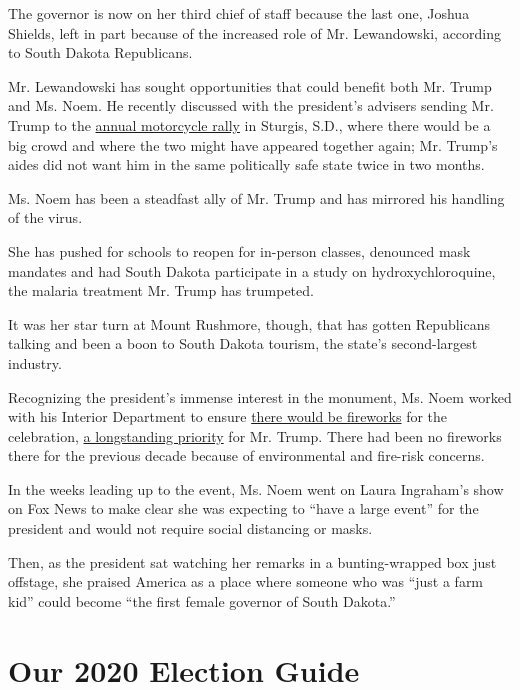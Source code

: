 The governor is now on her third chief of staff because the last one,
Joshua Shields, left in part because of the increased role of Mr.
Lewandowski, according to South Dakota Republicans.

Mr. Lewandowski has sought opportunities that could benefit both Mr.
Trump and Ms. Noem. He recently discussed with the president's advisers
sending Mr. Trump to the
\href{https://www.nytimes.com/2020/08/07/us/sturgis-motorcyle-rally.html}{annual
motorcycle rally} in Sturgis, S.D., where there would be a big crowd and
where the two might have appeared together again; Mr. Trump's aides did
not want him in the same politically safe state twice in two months.

Ms. Noem has been a steadfast ally of Mr. Trump and has mirrored his
handling of the virus.

She has pushed for schools to reopen for in-person classes, denounced
mask mandates and had South Dakota participate in a study on
hydroxychloroquine, the malaria treatment Mr. Trump has trumpeted.

It was her star turn at Mount Rushmore, though, that has gotten
Republicans talking and been a boon to South Dakota tourism, the state's
second-largest industry.

Recognizing the president's immense interest in the monument, Ms. Noem
worked with his Interior Department to ensure
\href{https://www.whitehouse.gov/briefings-statements/remarks-president-trump-signing-u-s-china-phase-one-trade-agreement-2/}{there
would be fireworks} for the celebration,
\href{https://twitter.com/realDonaldTrump/status/1125941300518432771}{a
longstanding priority} for Mr. Trump. There had been no fireworks there
for the previous decade because of environmental and fire-risk concerns.

In the weeks leading up to the event, Ms. Noem went on Laura Ingraham's
show on Fox News to make clear she was expecting to ``have a large
event'' for the president and would not require social distancing or
masks.

Then, as the president sat watching her remarks in a bunting-wrapped box
just offstage, she praised America as a place where someone who was
``just a farm kid'' could become ``the first female governor of South
Dakota.''

\hypertarget{our-2020-election-guide}{%
\section{Our 2020 Election Guide}\label{our-2020-election-guide}}


